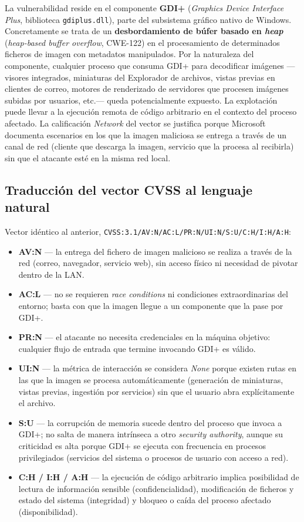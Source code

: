 La vulnerabilidad reside en el componente \textbf{GDI+} (\textit{Graphics Device Interface Plus}, biblioteca \texttt{gdiplus.dll}), parte del subsistema gráfico nativo de Windows. Concretamente se trata de un \textbf{desbordamiento de búfer basado en \textit{heap}} (\textit{heap-based buffer overflow}, CWE-122) en el procesamiento de determinados ficheros de imagen con metadatos manipulados. Por la naturaleza del componente, cualquier proceso que consuma GDI+ para decodificar imágenes ---visores integrados, miniaturas del Explorador de archivos, vistas previas en clientes de correo, motores de renderizado de servidores que procesen imágenes subidas por usuarios, etc.--- queda potencialmente expuesto. La explotación puede llevar a la ejecución remota de código arbitrario en el contexto del proceso afectado. La calificación \textit{Network} del vector se justifica porque Microsoft documenta escenarios en los que la imagen maliciosa se entrega a través de un canal de red (cliente que descarga la imagen, servicio que la procesa al recibirla) sin que el atacante esté en la misma red local.

\subsection*{Traducción del vector CVSS al lenguaje natural}

Vector idéntico al anterior, \texttt{CVSS:3.1/AV:N/AC:L/PR:N/UI:N/S:U/C:H/I:H/A:H}:

\begin{itemize}[leftmargin=*]
    \item \textbf{AV:N} --- la entrega del fichero de imagen malicioso se realiza a través de la red (correo, navegador, servicio web), sin acceso físico ni necesidad de pivotar dentro de la LAN.
    \item \textbf{AC:L} --- no se requieren \textit{race conditions} ni condiciones extraordinarias del entorno; basta con que la imagen llegue a un componente que la pase por GDI+.
    \item \textbf{PR:N} --- el atacante no necesita credenciales en la máquina objetivo: cualquier flujo de entrada que termine invocando GDI+ es válido.
    \item \textbf{UI:N} --- la métrica de interacción se considera \textit{None} porque existen rutas en las que la imagen se procesa automáticamente (generación de miniaturas, vistas previas, ingestión por servicios) sin que el usuario abra explícitamente el archivo.
    \item \textbf{S:U} --- la corrupción de memoria sucede dentro del proceso que invoca a GDI+; no salta de manera intrínseca a otro \textit{security authority}, aunque su criticidad es alta porque GDI+ se ejecuta con frecuencia en procesos privilegiados (servicios del sistema o procesos de usuario con acceso a red).
    \item \textbf{C:H / I:H / A:H} --- la ejecución de código arbitrario implica posibilidad de lectura de información sensible (confidencialidad), modificación de ficheros y estado del sistema (integridad) y bloqueo o caída del proceso afectado (disponibilidad).
\end{itemize}

